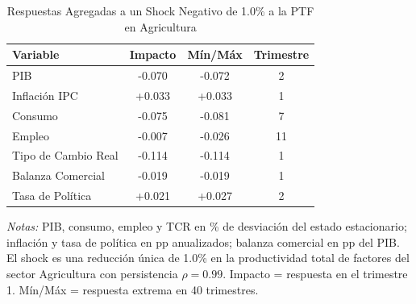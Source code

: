 \begin{table}[htbp]
\centering
\caption{Respuestas Agregadas a un Shock Negativo de 1.0\% a la PTF en Agricultura}
\label{tab:agr_agg}
\begin{threeparttable}
\begin{tabular}{@{}l c c c@{}}
\toprule
Variable & Impacto & Mín/Máx & Trimestre \\
\midrule
PIB & -0.070 & -0.072 & 2 \\
Inflación IPC & +0.033 & +0.033 & 1 \\
Consumo & -0.075 & -0.081 & 7 \\
Empleo & -0.007 & -0.026 & 11 \\
Tipo de Cambio Real & -0.114 & -0.114 & 1 \\
Balanza Comercial & -0.019 & -0.019 & 1 \\
Tasa de Política & +0.021 & +0.027 & 2 \\
\bottomrule
\end{tabular}
\begin{tablenotes}[flushleft]
\footnotesize
\item \textit{Notas:} PIB, consumo, empleo y TCR en \% de desviación del estado estacionario; inflación y tasa de política en pp anualizados; balanza comercial en pp del PIB. El shock es una reducción única de 1.0\% en la productividad total de factores del sector Agricultura con persistencia $\rho = 0.99$. Impacto = respuesta en el trimestre 1. Mín/Máx = respuesta extrema en 40 trimestres.
\end{tablenotes}
\end{threeparttable}
\end{table}
